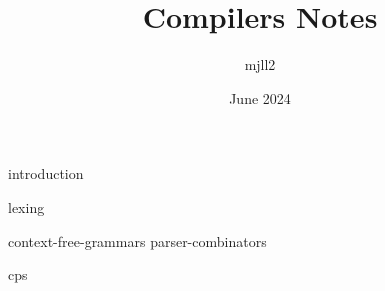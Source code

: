 \documentclass[12pt,a4paper,twoside,openany, chapterprefix=on]{scrbook}
\title{Compilers Notes}
\author{mjll2}
\date{June 2024}
\begin{document}
\maketitle

{introduction}

{lexing}

{context-free-grammars}
{parser-combinators}


{cps}


\end{document}
